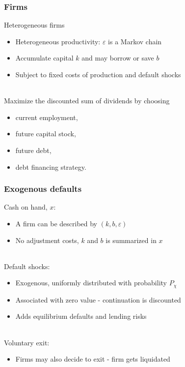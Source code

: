 \documentclass[notes]{beamer}
\begin{document}
\begin{frame}
\frametitle{Firms}
Heterogeneous firms
\begin{itemize}  \setlength\itemsep{0em}
\item Heterogeneous productivity: $\varepsilon$ is a Markov chain
\item Accumulate capital $k$ and may borrow or save $b$
\item Subject to fixed costs of production and default shocks
\end{itemize} \vspace{3mm} \\
Maximize the discounted sum of dividends by choosing
\begin{itemize}  \setlength\itemsep{0em}
    \item current employment,    
    \item future capital stock, 
    \item future debt,
    \item debt financing strategy.
\end{itemize} 

\end{frame}

\begin{frame}[label = exdef]
\frametitle{Exogenous defaults}

Cash on hand, $x$: 
\begin{itemize}\setlength\itemsep{0em}
    \item A firm can be described by $(k,b,\varepsilon)$
    \item No adjustment costs, $k$ and $b$ is summarized in $x$
\end{itemize}  \vspace{2mm} \\

Default shocks:
\begin{itemize} \setlength\itemsep{0em}
\item Exogenous, uniformly distributed with probability $P_\chi$
\item Associated with zero value - continuation is discounted
\item Adds equilibrium defaults and lending risks
\end{itemize} \vspace{2mm} \\

Voluntary exit: 
\begin{itemize}
    \item Firms may also decide to exit - firm gets liquidated
\end{itemize}

\begin{center}
\hyperlink{volex}{}
\end{center}

\end{frame}
\end{document}
